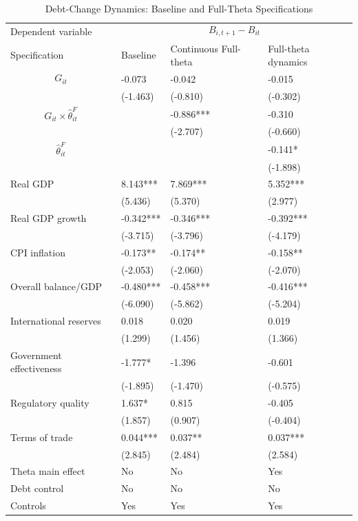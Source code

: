 \begin{table}[H]\centering
\begin{threeparttable}
\caption{Debt-Change Dynamics: Baseline and Full-Theta Specifications}
\label{tab:debt_change_combined_fulltheta}
\scriptsize
\begin{tabularx}{\textwidth}{lYYY}
\toprule
Dependent variable &  \\
\cmidrule(lr){2-4}
Specification & Baseline & Continuous Full-theta & Full-theta dynamics \\
\midrule
$$G_{it}$$ & -0.073 & -0.042 & -0.015 \\
 & (-1.463) & (-0.810) & (-0.302) \\
$$G_{it}\times\widehat{\theta}^{F}_{it}$$ &  & -0.886*** & -0.310 \\
 &  & (-2.707) & (-0.660) \\
$$\widehat{\theta}^{F}_{it}$$ &  &  & -0.141* \\
 &  &  & (-1.898) \\
Real GDP & 8.143*** & 7.869*** & 5.352*** \\
 & (5.436) & (5.370) & (2.977) \\
Real GDP growth & -0.342*** & -0.346*** & -0.392*** \\
 & (-3.715) & (-3.796) & (-4.179) \\
CPI inflation & -0.173** & -0.174** & -0.158** \\
 & (-2.053) & (-2.060) & (-2.070) \\
Overall balance/GDP & -0.480*** & -0.458*** & -0.416*** \\
 & (-6.090) & (-5.862) & (-5.204) \\
International reserves & 0.018 & 0.020 & 0.019 \\
 & (1.299) & (1.456) & (1.366) \\
Government effectiveness & -1.777* & -1.396 & -0.601 \\
 & (-1.895) & (-1.470) & (-0.575) \\
Regulatory quality & 1.637* & 0.815 & -0.405 \\
 & (1.857) & (0.907) & (-0.404) \\
Terms of trade & 0.044*** & 0.037** & 0.037*** \\
 & (2.845) & (2.484) & (2.584) \\
\midrule
Theta main effect & No & No & Yes \\
Debt control & No & No & No \\
Controls & Yes & Yes & Yes \\

\end{tabularx}
\end{threeparttable}
\end{table}
